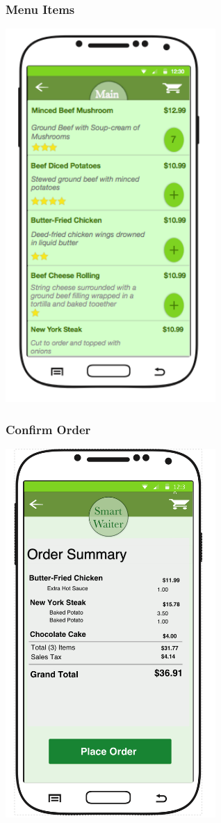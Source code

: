 \documentclass[12pt, titlepage]{article}
\begin{document}
\subsubsection{Menu Items}
\includegraphics[width=80mm,scale=0.5]{CategoryItems.png}

\subsubsection{Confirm Order}
\includegraphics[width=80mm,scale=0.5]{OrderSummary.png}
\end{document}
